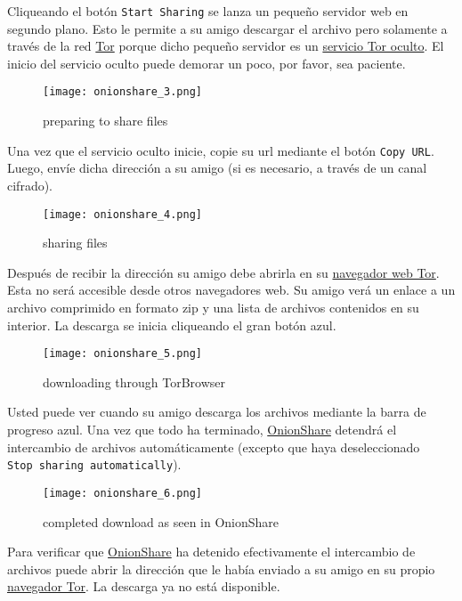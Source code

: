 \documentclass[10pt,a5paper,twoside,,]{book}
\begin{document}
Cliqueando el botón \texttt{Start\ Sharing} se lanza un pequeño servidor
web en segundo plano. Esto le permite a su amigo descargar el archivo
pero solamente a través de la red \href{https://torproject.org}{Tor}
porque dicho pequeño servidor es un
\href{https://tor.eff.org/docs/hidden-services.html.en}{servicio Tor
oculto}. El inicio del servicio oculto puede demorar un poco, por favor,
sea paciente.

\begin{figure}[htbp]
\centering
\texttt{[image: onionshare\_3.png]}
\caption{preparing to share files}
\end{figure}

Una vez que el servicio oculto inicie, copie su url mediante el botón
\texttt{Copy\ URL}. Luego, envíe dicha dirección a su amigo (si es
necesario, a través de un canal cifrado).

\begin{figure}[htbp]
\centering
\texttt{[image: onionshare\_4.png]}
\caption{sharing files}
\end{figure}

Después de recibir la dirección su amigo debe abrirla en su
\href{https://www.torproject.org/download/download-easy.html.en}{navegador
web Tor}. Esta no será accesible desde otros navegadores web. Su amigo
verá un enlace a un archivo comprimido en formato zip y una lista de
archivos contenidos en su interior. La descarga se inicia cliqueando el
gran botón azul.

\begin{figure}[htbp]
\centering
\texttt{[image: onionshare\_5.png]}
\caption{downloading through TorBrowser}
\end{figure}

Usted puede ver cuando su amigo descarga los archivos mediante la barra
de progreso azul. Una vez que todo ha terminado,
\href{https://onionshare.org}{OnionShare} detendrá el intercambio de
archivos automáticamente (excepto que haya deseleccionado
\texttt{Stop\ sharing\ automatically}).

\begin{figure}[htbp]
\centering
\texttt{[image: onionshare\_6.png]}
\caption{completed download as seen in OnionShare}
\end{figure}

Para verificar que \href{https://onionshare.org}{OnionShare} ha detenido
efectivamente el intercambio de archivos puede abrir la dirección que le
había enviado a su amigo en su propio
\href{https://www.torproject.org/download/download-easy.html.en}{navegador
Tor}. La descarga ya no está disponible.
\end{document}
